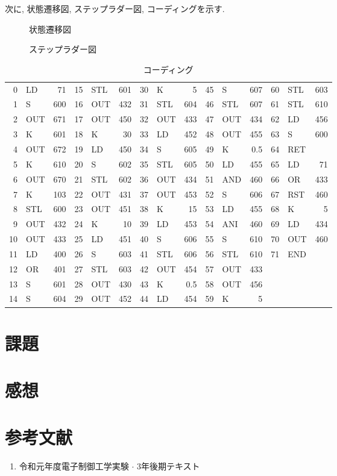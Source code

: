 \documentclass[titlepage]{jsarticle}
\begin{document}
    次に, 状態遷移図, ステップラダー図, コーディングを示す.
    \begin{figure}[h]
      \centering
      \caption{状態遷移図}
    \end{figure}
    \begin{figure}[h]
      \centering
      \caption{ステップラダー図}
    \end{figure}
    \begin{table}[h]
      \caption{コーディング}
      \centering
      \begin{tabular}{r|lr||r|lr||r|lr||r|lr||r|lr}
        0 &  LD &  71 &  15 & STL & 601 & 30 & K &   5 &   45 & S &   607 & 60 & STL & 603 \\
        1 &  S &   600 & 16 & OUT & 432 & 31 & STL & 604 & 46 & STL & 607 & 61 & STL & 610 \\
        2 &  OUT & 671 & 17 & OUT & 450 & 32 & OUT & 433 & 47 & OUT & 434 & 62 & LD &  456 \\
        3 &  K &   601 & 18 & K &   30 &  33 & LD &  452 & 48 & OUT & 455 & 63 & S &   600 \\
        4 &  OUT & 672 & 19 & LD &  450 & 34 & S &   605 & 49 & K &   0.5 & 64 & RET & \\
        5 &  K &   610 & 20 & S &   602 & 35 & STL & 605 & 50 & LD &  455 & 65 & LD &  71 \\
        6 &  OUT & 670 & 21 & STL & 602 & 36 & OUT & 434 & 51 & AND & 460 & 66 & OR &  433 \\
        7 &  K &   103 & 22 & OUT & 431 & 37 & OUT & 453 & 52 & S &   606 & 67 & RST & 460 \\
        8 &  STL & 600 & 23 & OUT & 451 & 38 & K &   15 &  53 & LD &  455 & 68 & K &   5 \\
        9 &  OUT & 432 & 24 & K &   10 &  39 & LD &  453 & 54 & ANI & 460 & 69 & LD &  434 \\
        10 & OUT & 433 & 25 & LD &  451 & 40 & S &   606 & 55 & S &   610 & 70 & OUT & 460 \\
        11 & LD &  400 & 26 & S &   603 & 41 & STL & 606 & 56 & STL & 610 & 71 & END & \\
        12 & OR &  401 & 27 & STL & 603 & 42 & OUT & 454 & 57 & OUT & 433 & & & \\
        13 & S &   601 & 28 & OUT & 430 & 43 & K &   0.5 & 58 & OUT & 456 & & & \\
        14 & S &   604 & 29 & OUT & 452 & 44 & LD &  454 & 59 & K &   5 & & & \\
      \end{tabular}
    \end{table}
\section{課題}
\section{感想}
\section*{参考文献}
  \begin{enumerate}
    \item 令和元年度電子制御工学実験 $\cdot$ 3年後期テキスト
  \end{enumerate}
\end{document}
